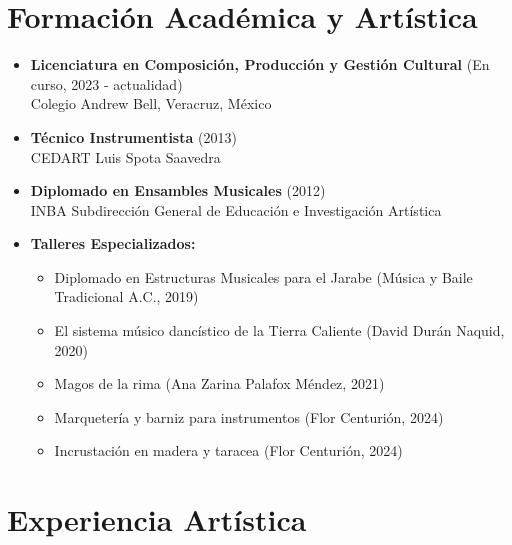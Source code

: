 \documentclass{article}
\begin{document}
\section*{Formación Académica y Artística}
\begin{itemize}
    \item \textbf{Licenciatura en Composición, Producción y Gestión Cultural} (En curso, 2023 - actualidad)\\ Colegio Andrew Bell, Veracruz, México
    \item \textbf{Técnico Instrumentista} (2013)\\ CEDART Luis Spota Saavedra
    \item \textbf{Diplomado en Ensambles Musicales} (2012)\\ INBA Subdirección General de Educación e Investigación Artística
    \item \textbf{Talleres Especializados:}
    \begin{itemize}
        \item Diplomado en Estructuras Musicales para el Jarabe (Música y Baile Tradicional A.C., 2019)
        \item El sistema músico dancístico de la Tierra Caliente (David Durán Naquid, 2020)
        \item Magos de la rima (Ana Zarina Palafox Méndez, 2021)
        \item Marquetería y barniz para instrumentos (Flor Centurión, 2024)
        \item Incrustación en madera y taracea (Flor Centurión, 2024)
    \end{itemize}
\end{itemize}

\section*{Experiencia Artística}
\end{document}
